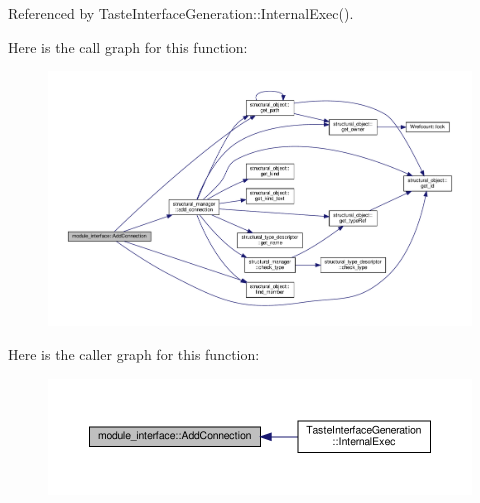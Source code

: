 Referenced by Taste\+Interface\+Generation\+::\+Internal\+Exec().

Here is the call graph for this function\+:
\nopagebreak
\begin{figure}[H]
\begin{center}
\leavevmode
\includegraphics[width=350pt]{d9/d0e/classmodule__interface_a2b729018fc92ed9b1b7c9453af47f8f1_cgraph}
\end{center}
\end{figure}
Here is the caller graph for this function\+:
\nopagebreak
\begin{figure}[H]
\begin{center}
\leavevmode
\includegraphics[width=350pt]{d9/d0e/classmodule__interface_a2b729018fc92ed9b1b7c9453af47f8f1_icgraph}
\end{center}
\end{figure}
\mbox{\label{classmodule__interface_ada3f993c47781a9571fb5edd982a9af2}} 
